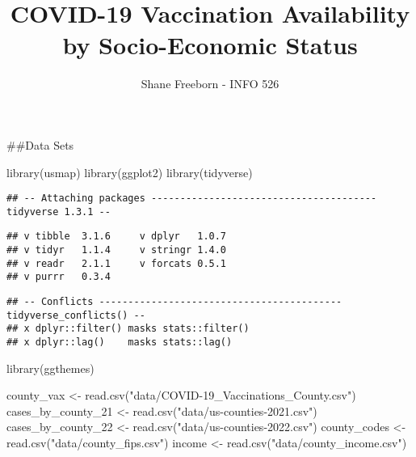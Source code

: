 \documentclass[
]{article}
\title{COVID-19 Vaccination Availability by Socio-Economic Status}
\author{Shane Freeborn - INFO 526}
\date{}
\newenvironment{Shaded}{\begin{snugshade}}{\end{snugshade}}
\newcommand{\FunctionTok}[1]{\textcolor[rgb]{0.00,0.00,0.00}{#1}}
\newcommand{\NormalTok}[1]{#1}
\newcommand{\OtherTok}[1]{\textcolor[rgb]{0.56,0.35,0.01}{#1}}
\newcommand{\StringTok}[1]{\textcolor[rgb]{0.31,0.60,0.02}{#1}}
\begin{document}
\maketitle

\#\#Data Sets

\begin{Shaded}
\begin{Highlighting}[]
\FunctionTok{library}\NormalTok{(usmap)}
\FunctionTok{library}\NormalTok{(ggplot2)}
\FunctionTok{library}\NormalTok{(tidyverse)}
\end{Highlighting}
\end{Shaded}

\begin{verbatim}
## -- Attaching packages --------------------------------------- tidyverse 1.3.1 --
\end{verbatim}

\begin{verbatim}
## v tibble  3.1.6     v dplyr   1.0.7
## v tidyr   1.1.4     v stringr 1.4.0
## v readr   2.1.1     v forcats 0.5.1
## v purrr   0.3.4
\end{verbatim}

\begin{verbatim}
## -- Conflicts ------------------------------------------ tidyverse_conflicts() --
## x dplyr::filter() masks stats::filter()
## x dplyr::lag()    masks stats::lag()
\end{verbatim}

\begin{Shaded}
\begin{Highlighting}[]
\FunctionTok{library}\NormalTok{(ggthemes)}

\NormalTok{county\_vax }\OtherTok{\textless{}{-}} \FunctionTok{read.csv}\NormalTok{(}\StringTok{"data/COVID{-}19\_Vaccinations\_County.csv"}\NormalTok{)}
\NormalTok{cases\_by\_county\_21 }\OtherTok{\textless{}{-}} \FunctionTok{read.csv}\NormalTok{(}\StringTok{"data/us{-}counties{-}2021.csv"}\NormalTok{)}
\NormalTok{cases\_by\_county\_22 }\OtherTok{\textless{}{-}} \FunctionTok{read.csv}\NormalTok{(}\StringTok{"data/us{-}counties{-}2022.csv"}\NormalTok{)}
\NormalTok{county\_codes }\OtherTok{\textless{}{-}} \FunctionTok{read.csv}\NormalTok{(}\StringTok{"data/county\_fips.csv"}\NormalTok{)}
\NormalTok{income }\OtherTok{\textless{}{-}} \FunctionTok{read.csv}\NormalTok{(}\StringTok{"data/county\_income.csv"}\NormalTok{)}
\end{Highlighting}
\end{Shaded}
\end{document}
